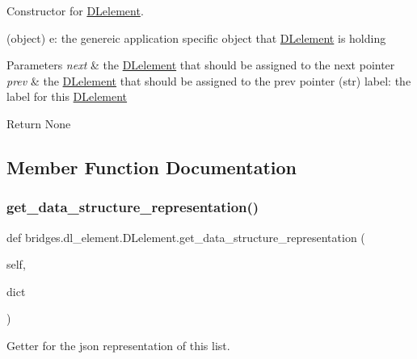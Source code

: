 Constructor for \hyperlink{classbridges_1_1dl__element_1_1_d_lelement}{D\+Lelement}. 

(object) e\+: the genereic application specific object that \hyperlink{classbridges_1_1dl__element_1_1_d_lelement}{D\+Lelement} is holding 
\begin{DoxyParams}{Parameters}
{\em next} & the \hyperlink{classbridges_1_1dl__element_1_1_d_lelement}{D\+Lelement} that should be assigned to the next pointer \\
\hline
{\em prev} & the \hyperlink{classbridges_1_1dl__element_1_1_d_lelement}{D\+Lelement} that should be assigned to the prev pointer (str) label\+: the label for this \hyperlink{classbridges_1_1dl__element_1_1_d_lelement}{D\+Lelement} \\
\hline
\end{DoxyParams}
\begin{DoxyParagraph}{Return}
None 
\end{DoxyParagraph}


\subsection{Member Function Documentation}
\mbox{\label{classbridges_1_1dl__element_1_1_d_lelement_abcae653ca8e9590c594910bad148ddf2}} 
\subsubsection{\texorpdfstring{get\+\_\+data\+\_\+structure\+\_\+representation()}{get\_data\_structure\_representation()}}
{\footnotesize\ttfamily def bridges.\+dl\+\_\+element.\+D\+Lelement.\+get\+\_\+data\+\_\+structure\+\_\+representation (\begin{DoxyParamCaption}\item[{}]{self,  }\item[{}]{dict }\end{DoxyParamCaption})}



Getter for the json representation of this list. 

